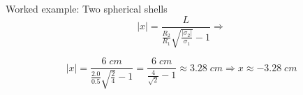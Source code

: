 {\begin{frame}{Worked example: Two spherical shells}
  \begin{equation*}
    |x| = \frac{L}{ \frac{R_{2}}{R_{1}} \sqrt{\frac{|\sigma_{2}|}{\sigma_{1}}} - 1} \Rightarrow
  \end{equation*}

  \begin{equation*}
    |x| = \frac{6\; cm}{ \frac{2.0}{0.5} \sqrt{\frac{2}{4}} - 1}
        = \frac{6\; cm}{ \frac{4}{\sqrt{2}} - 1} \approx 3.28 \; cm
    \Rightarrow
    x \approx -3.28 \; cm
  \end{equation*}

\end{frame}

} %


%
%

